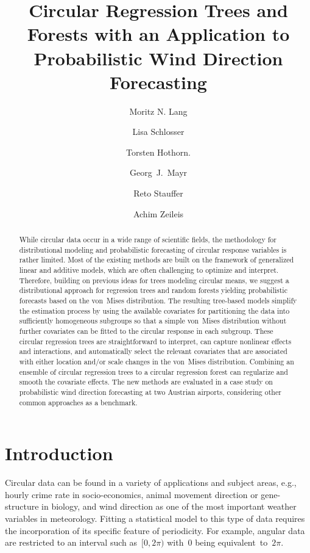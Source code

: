 \documentclass{statsoc}
\title[Circular Regression Trees and Forests]{Circular Regression Trees and Forests with an Application to Probabilistic Wind Direction Forecasting}
\author{Moritz N. Lang}
\author{Lisa Schlosser}
\author{Torsten Hothorn.}
\author{Georg~J.~Mayr}
\author{Reto Stauffer}
\author[Lang, Schlosser, Hothorn, Mayr, Stauffer, Zeileis]{Achim Zeileis}
\begin{document}
\begin{abstract}
While circular data occur in a wide range of scientific fields, the methodology
for distributional modeling and probabilistic forecasting of circular response
variables is rather limited. Most of the existing methods are built on the
framework of generalized linear and additive models, which are often
challenging to optimize and interpret. Therefore, building on previous ideas
for trees modeling circular means, we suggest a distributional approach for
regression trees and random forests yielding probabilistic forecasts based on
the von~Mises distribution. The resulting tree-based models simplify the
estimation process by using the available covariates for partitioning the data
into sufficiently homogeneous subgroups so that a simple von~Mises distribution
without further covariates can be fitted to the circular response in each
subgroup. These circular regression trees are straightforward to interpret, can
capture nonlinear effects and interactions, and automatically select the
relevant covariates that are associated with either location and/or scale
changes in the von~Mises distribution. Combining an ensemble of circular
regression trees to a circular regression forest can regularize and smooth the
covariate effects. The new methods are evaluated in a case study on
probabilistic wind direction forecasting at two Austrian airports, considering
other common approaches as a benchmark.
\end{abstract}




\section{Introduction}
\label{sec:introduction}

Circular data can be found in a variety of applications and subject areas,
e.g., hourly crime rate in socio-economics, animal movement direction or
gene-structure in biology, and wind direction as one of the most important
weather variables in meteorology. Fitting a statistical model to this type of
data requires the incorporation of its specific feature of periodicity. For
example, angular data are restricted to an interval such as~$[0,2\pi)$ with~$0$
being equivalent~to~$2\pi$.
\end{document}
